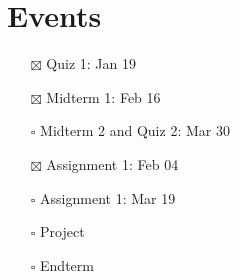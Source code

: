 \documentclass[11pt]{article}
\begin{document}
\section{Events}
\label{sec:org51a13d9}
\begin{itemize}
\item[{$\boxtimes$}] Quiz 1: Jan 19
\item[{$\boxtimes$}] Midterm 1: Feb 16
\item[{$\square$}] Midterm 2 and Quiz 2: Mar 30
\item[{$\boxtimes$}] Assignment 1: Feb 04
\item[{$\square$}] Assignment 1: Mar 19
\item[{$\square$}] Project
\item[{$\square$}] Endterm
\end{itemize}
\end{document}
